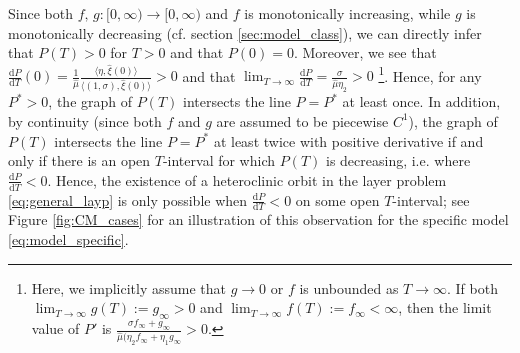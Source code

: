 \documentclass[a4paper,10pt,abstract=true,parskip=true]{scrartcl}
\theoremstyle{remark}
\numberwithin{equation}{section}
\numberwithin{thm}{section}
\begin{document}
Since both $f,\, g : [0,\infty) \to [0,\infty)$ and $f$ is monotonically increasing, while $g$ is monotonically decreasing (cf. section \ref{sec:model_class}), we can directly infer that $P(T) > 0$ for $T>0$ and that $P(0) = 0$. Moreover, we see that $\frac{\text{d} P}{\text{d} T}(0) = \frac{1}{\hat{\mu}} \frac{\langle \eta,\hat{\xi}(0)\rangle}{\langle (1,\sigma),\hat{\xi}(0)\rangle} > 0$ and that $\lim_{T \to \infty} \frac{\text{d} P}{\text{d} T} = \frac{\sigma}{\hat{\mu}\eta_2} > 0$ \footnote{Here, we implicitly assume that $g \to 0$ or $f$ is unbounded as $T \to \infty$. If both $\lim_{T \to \infty}g(T) := g_\infty > 0$ and $\lim_{T \to \infty}f(T) := f_\infty < \infty$, then the limit value of $P'$ is $\frac{\sigma f_\infty+g_\infty}{\hat{\mu}(\eta_2 f_\infty + \eta_1 g_\infty}>0$.}. Hence, for any $P^\ast >0$, the graph of $P(T)$ intersects the line $P = P^\ast$ at least once. In addition, by continuity (since both $f$ and $g$ are assumed to be piecewise $C^1$), the graph of $P(T)$ intersects the line $P = P^\ast$ at least twice with positive derivative if and only if there is an open $T$-interval for which $P(T)$ is decreasing, i.e. where $\frac{\text{d}P}{\text{d}T} < 0$. Hence, the existence of a heteroclinic orbit in the layer problem \eqref{eq:general_layp} is only possible when $\frac{\text{d}P}{\text{d}T} < 0$ on some open $T$-interval; see Figure \ref{fig:CM_cases} for an illustration of this observation for the specific model \eqref{eq:model_specific}.\\
\end{document}
